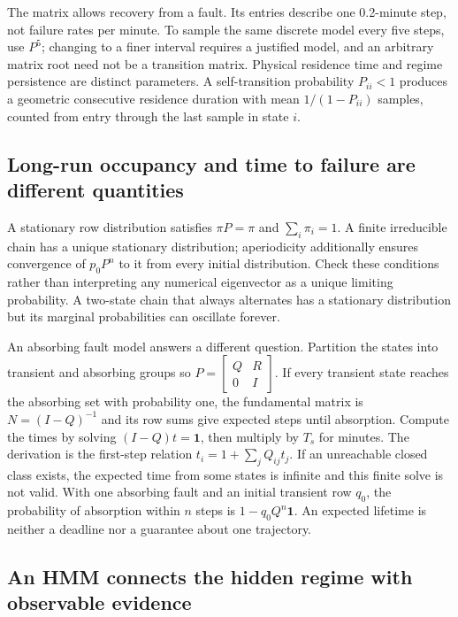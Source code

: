 \documentclass[11pt,a4paper]{article}
\begin{document}
The matrix allows recovery from a fault. Its entries describe one 0.2-minute step, not failure rates per minute. To sample the same discrete model every five steps, use $P^5$; changing to a finer interval requires a justified model, and an arbitrary matrix root need not be a transition matrix. Physical residence time and regime persistence are distinct parameters. A self-transition probability $P_{ii}<1$ produces a geometric consecutive residence duration with mean $1/(1-P_{ii})$ samples, counted from entry through the last sample in state $i$.


\subsection{Long-run occupancy and time to failure are different quantities}

A stationary row distribution satisfies $\pi P=\pi$ and $\sum_i\pi_i=1$. A finite irreducible chain has a unique stationary distribution; aperiodicity additionally ensures convergence of $p_0P^n$ to it from every initial distribution. Check these conditions rather than interpreting any numerical eigenvector as a unique limiting probability. A two-state chain that always alternates has a stationary distribution but its marginal probabilities can oscillate forever.


An absorbing fault model answers a different question. Partition the states into transient and absorbing groups so $P=\left[\begin{smallmatrix}Q&R\\0&I\end{smallmatrix}\right]$. If every transient state reaches the absorbing set with probability one, the fundamental matrix is $N=(I-Q)^{-1}$ and its row sums give expected steps until absorption. Compute the times by solving $(I-Q)t=\mathbf{1}$, then multiply by $T_s$ for minutes. The derivation is the first-step relation $t_i=1+\sum_jQ_{ij}t_j$. If an unreachable closed class exists, the expected time from some states is infinite and this finite solve is not valid. With one absorbing fault and an initial transient row $q_0$, the probability of absorption within $n$ steps is $1-q_0Q^n\mathbf{1}$. An expected lifetime is neither a deadline nor a guarantee about one trajectory.


\subsection{An HMM connects the hidden regime with observable evidence}
\end{document}

